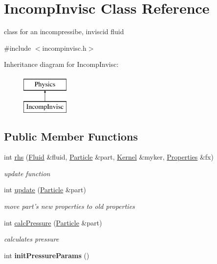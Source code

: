 \hypertarget{classIncompInvisc}{\section{\-Incomp\-Invisc \-Class \-Reference}
\label{classIncompInvisc}
}


class for an incompressibe, inviscid fluid  




{\ttfamily \#include $<$incompinvisc.\-h$>$}

\-Inheritance diagram for \-Incomp\-Invisc\-:\begin{figure}[H]
\begin{center}
\leavevmode
\includegraphics[height=2.000000cm]{classIncompInvisc}
\end{center}
\end{figure}
\subsection*{\-Public \-Member \-Functions}
\begin{DoxyCompactItemize}
\item 
int \hyperlink{classIncompInvisc_a06fbd0a590ef1ef102352a094ae4c698}{rhs} (\hyperlink{classFluid}{\-Fluid} \&fluid, \hyperlink{classParticle}{\-Particle} \&part, \hyperlink{classKernel}{\-Kernel} \&myker, \hyperlink{structProperties}{\-Properties} \&fx)
\begin{DoxyCompactList}\small\item\em update function \end{DoxyCompactList}\item 
\hypertarget{classIncompInvisc_a06483b536f7464b593b55fe4d11a45ce}{int \hyperlink{classIncompInvisc_a06483b536f7464b593b55fe4d11a45ce}{update} (\hyperlink{classParticle}{\-Particle} \&part)}\label{classIncompInvisc_a06483b536f7464b593b55fe4d11a45ce}

\begin{DoxyCompactList}\small\item\em move part's new properties to old properties \end{DoxyCompactList}\item 
\hypertarget{classIncompInvisc_a4363561397ee2a76b67c23851fbaced5}{int \hyperlink{classIncompInvisc_a4363561397ee2a76b67c23851fbaced5}{calc\-Pressure} (\hyperlink{classParticle}{\-Particle} \&part)}\label{classIncompInvisc_a4363561397ee2a76b67c23851fbaced5}

\begin{DoxyCompactList}\small\item\em calculates pressure \end{DoxyCompactList}\item 
\hypertarget{classIncompInvisc_a51217aaa5b957cc843a7a81b59b82518}{int {\bfseries init\-Pressure\-Params} ()}\label{classIncompInvisc_a51217aaa5b957cc843a7a81b59b82518}

\end{DoxyCompactItemize}


